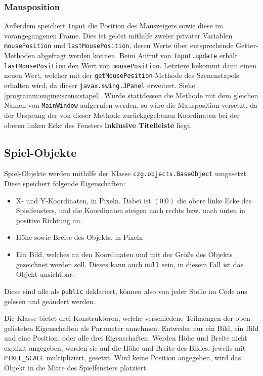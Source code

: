 \begin{sloppypar}
\subsubsection{Mausposition}

Außerdem speichert \texttt{Input} die Position des Mauszeigers
sowie diese im vorangegangenen Frame. Dies ist gelöst mithilfe
zweier privater Variablen \texttt{mousePosition} und
\texttt{lastMousePosition}, deren Werte über entsprechende
Getter-Methoden abgefragt werden können. Beim Aufruf von
\texttt{Input.update} erhält \texttt{lastMousePosition} den
Wert von \texttt{mousePosition}. Letztere bekommt dann einen
neuen Wert, welcher mit der \texttt{getMousePosition}-Methode
des Szenenstapels erhalten wird, da dieser \texttt{javax.swing.JPanel}
erweitert. Siehe \ref{programm:engine:szene:stapel}. Würde
stattdessen die Methode mit dem gleichen Namen von \texttt{MainWindow}
aufgerufen werden, so wäre die Mausposition versetzt, da der
Ursprung der von dieser Methode zurückgegebenen Koordinaten
bei der oberen linken Ecke des Fensters \textbf{inklusive Titelleiste}
liegt.

\subsection{Spiel-Objekte}

Spiel-Objekte werden mithilfe der Klasse \texttt{czg.objects.BaseObject}
umgesetzt. Diese speichert folgende Eigenschaften:

\begin{itemize}
	\item X- und Y-Koordinaten, in Pixeln. Dabei ist $(0|0)$ die
		  obere linke Ecke des Spielfensters, und die Koordinaten
		  steigen nach rechts bzw. nach unten in positive Richtung an.
	\item Höhe sowie Breite des Objekts, in Pixeln
	\item Ein Bild, welches an den Koordinaten und mit der Größe
	      des Objekts gezeichnet werden soll. Dieses kann auch
	      \texttt{null} sein, in diesem Fall ist das Objekt
	      unsichtbar.
\end{itemize}

Diese sind alle als \texttt{public} deklariert, können also
von jeder Stelle im Code aus gelesen und geändert werden.

Die Klasse bietet drei Konstruktoren, welche verschiedene
Teilmengen der oben gelisteten Eigenschaften als Parameter
annehmen: Entweder nur ein Bild, ein Bild und eine Position,
oder alle drei Eigenschaften. Werden Höhe und Breite nicht
explizit angegeben, werden sie auf die Höhe und Breite des
Bildes, jeweils mit \texttt{PIXEL\_SCALE} multipliziert,
gesetzt. Wird keine Position angegeben, wird das Objekt
in die Mitte des Spielfensters platziert.


\end{sloppypar}
